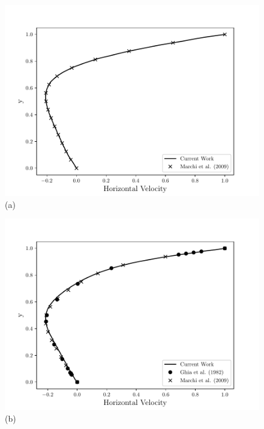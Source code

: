 \begin{center}
\begin{figure}[H]
     \centering
     \begin{minipage}{.5\linewidth}
      \centering
      \includegraphics[scale=0.53]{./02_chaps/cap_validation/figure/Re_10_u_profile.pdf}\\
      (a)
     \end{minipage}%
     \begin{minipage}{.5\linewidth}
      \centering
      \includegraphics[scale=0.53]{./02_chaps/cap_validation/figure/Re_100_u_profile.pdf}\\
      (b)
     \end{minipage}
     \begin{minipage}{.5\linewidth}

\end{minipage}
\end{figure}
\end{center}
